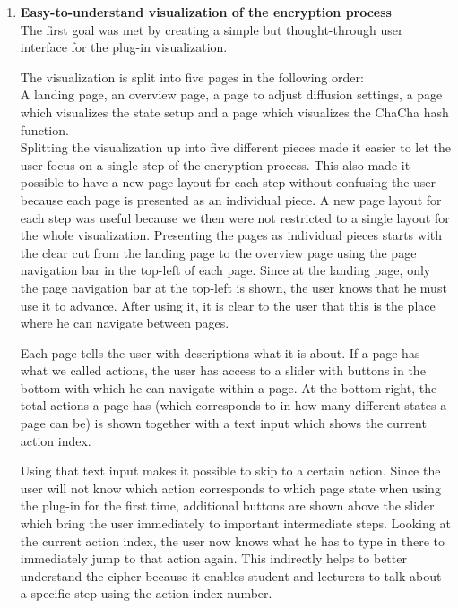 \begin{enumerate}[label=(\labelenum{G}{{\arabic*}}), wide, labelwidth=!, labelindent=0pt]
\setlength{\parskip}{0pt}
    \item \textbf{Easy-to-understand visualization of the encryption process}\\
    The first goal was met by creating a simple but thought-through user interface for the plug-in visualization.
    
     The visualization is split into five pages in the following order:\\
      A landing page, an overview page, a page to adjust diffusion settings, a page which visualizes the state setup and a page which visualizes the ChaCha hash function.\\
     Splitting the visualization up into five different pieces made it easier to let the user focus on a single step of the encryption process. This also made it possible to have a new page layout for each step without confusing the user because each page is presented as an individual piece. A new page layout for each step was useful because we then were not restricted to a single layout for the whole visualization. Presenting the pages as individual pieces starts with the clear cut from the landing page to the overview page using the page navigation bar in the top-left of each page. Since at the landing page, only the page navigation bar at the top-left is shown, the user knows that he must use it to advance. After using it, it is clear to the user that this is the place where he can navigate between pages.
     
     Each page tells the user with descriptions what it is about. If a page has what we called actions, the user has access to a slider with buttons in the bottom with which he can navigate within a page. At the bottom-right, the total actions a page has (which corresponds to in how many different states a page can be) is shown together with a text input which shows the current action index.
     
     Using that text input makes it possible to skip to a certain action. Since the user will not know which action corresponds to which page state when using the plug-in for the first time, additional buttons are shown above the slider which bring the user immediately to important intermediate steps. Looking at the current action index, the user now knows what he has to type in there to immediately jump to that action again. This indirectly helps to better understand the cipher because it enables student and lecturers to talk about a specific step using the action index number.
     

\end{enumerate}
